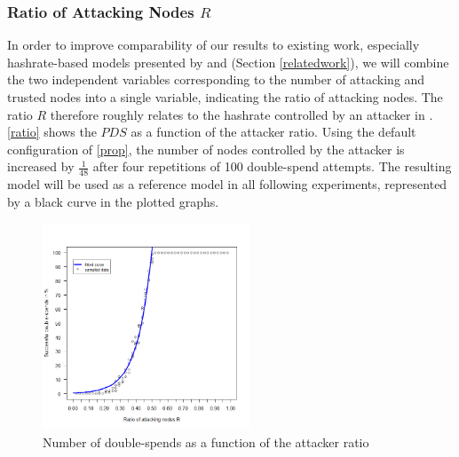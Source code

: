 \documentclass[a4paper,12pt,twoside]{report}
\begin{document}
\subsubsection{Ratio of Attacking Nodes $R$}
In order to improve comparability of our results to existing work, especially hashrate-based models presented by \cite{HBDSA} and \cite{DSAwithTime} (Section \ref{relatedwork}), we will combine the two independent variables corresponding to the number of attacking and trusted nodes into a single variable, indicating the ratio of attacking nodes. The ratio $R$ therefore roughly relates to the hashrate controlled by an attacker in \cite{nakamoto2008bitcoin,HBDSA,DSAwithTime}. \autoref{ratio} shows the $PDS$ as a function of the attacker ratio. Using the default configuration of \autoref{prop}, the number of nodes controlled by the attacker is increased by $\frac{1}{48}$ after four repetitions of 100 double-spend attempts. The resulting model will be used as a reference model in all following experiments, represented by a black curve in the plotted graphs.\begin{figure}[ht]
	\centering
  \includegraphics[width=0.55\textwidth]{Experiments/Ratio/ratio_f.png}
	\caption{Number of double-spends as a function of the attacker ratio}
	\label{ratio}
\end{figure}
\end{document}
